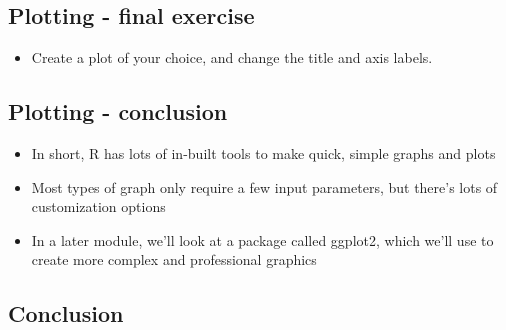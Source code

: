 \documentclass[]{article}
\providecommand{\tightlist}{%
  \setlength{\itemsep}{0pt}\setlength{\parskip}{0pt}}
\begin{document}
\subsection{Plotting - final exercise}\label{plotting---final-exercise}

\begin{itemize}
\tightlist
\item
  Create a plot of your choice, and change the title and axis labels.
\end{itemize}

\subsection{Plotting - conclusion}\label{plotting---conclusion}

\begin{itemize}
\tightlist
\item
  In short, R has lots of in-built tools to make quick, simple graphs
  and plots
\item
  Most types of graph only require a few input parameters, but there's
  lots of customization options
\item
  In a later module, we'll look at a package called ggplot2, which we'll
  use to create more complex and professional graphics
\end{itemize}

\subsection{Conclusion}\label{conclusion}
\end{document}

